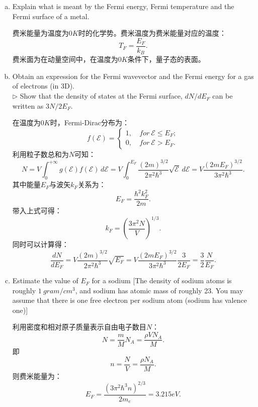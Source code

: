 \documentclass[reqno,a4paper,12pt]{amsart}
\begin{document}
\begin{enumerate}[(a)]
	\item Explain what is meant by the Fermi energy, Fermi temperature and the Fermi surface of a metal. 
	
	\begin{tcolorbox}[breakable, colback = black!5!white, colframe = black]
	费米能量为温度为$0K$时的化学势。费米温度为费米能量对应的温度：
	\[
		T_F = \frac{E_F}{k_B}.
	\]
	费米面为在动量空间中，在温度为$0K$条件下，量子态的表面。
	\end{tcolorbox}
		
	\item Obtain an expression for the Fermi wavevector and the Fermi energy for a gas of electrons (in 3D). \\
	$\triangleright$ Show that the density of states at the Fermi surface, $dN/dE_F$ can be written as $3N/2E_F$. 
	
	\begin{tcolorbox}[breakable, colback = black!5!white, colframe = black]
	在温度为$0K$时，Fermi-Dirac分布为：
	\[
		f(\mathcal{E}) = \left\{ \begin{aligned}
			1,~ &for ~ \mathcal{E} \leq E_F; \\
			0,~ &for ~ \mathcal{E} > E_F.
		\end{aligned}\right.
	\]
	利用粒子数总和为$N$可知：
	\[
		N = V\int_0^{+\infty} g(\mathcal{E}) f(\mathcal{E})\,d\mathcal{E} = V \int_0^{E_F} \frac{(2m)^{3/2}}{2\pi^2\hbar^3}\sqrt{\mathcal{E}}\,d\mathcal{E} = V \frac{(2mE_F)^{3/2}}{3\pi^2\hbar^3}.
	\]
	其中能量$E_F$与波矢$k_F$关系为：
	\[
		E_F = \frac{\hbar^2 k_F^2}{2m}.
	\]
	带入上式可得：
	\[
		k_F = \left( \frac{3\pi^2 N}{V} \right)^{1/3}.
	\]
	同时可以计算得：
	\[
		\frac{dN}{dE_F} = V \frac{(2m)^{3/2}}{2\pi^2\hbar^3} \sqrt{E_F} = V\frac{(2mE_F)^{3/2}}{3\pi^2\hbar^3}\frac{3}{2E_F} = \frac{3}{2}\frac{N}{E_F}.
	\]
	\end{tcolorbox}
	
	\item Estimate the value of $E_F$ for a sodium [The density of sodium atoms is roughly $1~gram/cm^3$, and sodium has atomic mass of roughly 23. You may assume that there is one free electron per sodium atom (sodium has valence one)] 
	
	\begin{tcolorbox}[breakable, colback = black!5!white, colframe = black]
	利用密度和相对原子质量表示自由电子数目$N$：
	\[
		N = \frac{m}{M}N_A = \frac{\rho VN_A}{M}.
	\]
	即
	\[
		n = \frac{N}{V} = \frac{\rho N_A}{M}.
	\]
	则费米能量为：
	\[
		E_F = \frac{(3\pi^2\hbar^3n)^{2/3}}{2m_e} = 3.215 eV.
	\]
	\end{tcolorbox}
	

\end{enumerate}
\end{document}
